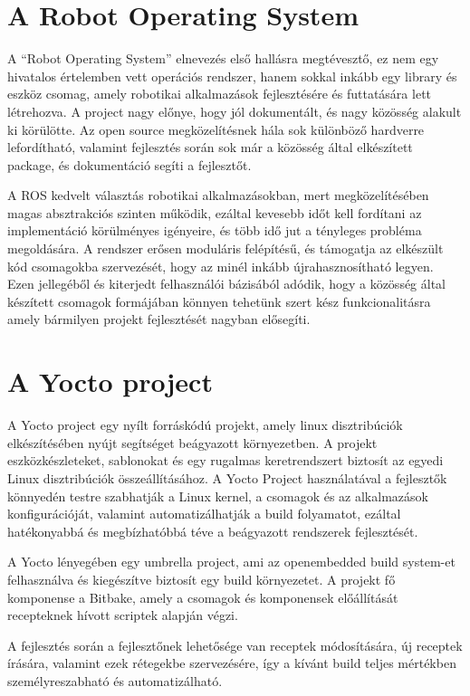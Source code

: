 \section{A Robot Operating System}

A ``Robot Operating System'' elnevezés első hallásra megtévesztő, ez nem egy
hivatalos értelemben vett operációs rendszer, hanem sokkal inkább egy library és
eszköz csomag, amely robotikai alkalmazások fejlesztésére és futtatására lett
létrehozva. A project nagy előnye, hogy jól dokumentált, és nagy közösség alakult
ki körülötte.  Az open source megközelítésnek hála sok különböző hardverre
lefordítható, valamint fejlesztés során sok már a közösség által elkészített
package, és dokumentáció segíti a fejlesztőt.

A ROS kedvelt választás robotikai alkalmazásokban, mert megközelítésében magas
absztrakciós szinten működik, ezáltal kevesebb időt kell fordítani az
implementáció körülményes igényeire, és több idő jut a tényleges probléma
megoldására. A rendszer erősen moduláris felépítésű, és támogatja az elkészült
kód csomagokba szervezését, hogy az minél inkább újrahasznosítható legyen. Ezen
jellegéből és kiterjedt felhasználói bázisából adódik, hogy a közösség által
készített csomagok formájában könnyen tehetünk szert kész funkcionalitásra amely
bármilyen projekt fejlesztését nagyban elősegíti.

\section{A Yocto project}

A Yocto project egy nyílt forráskódú projekt, amely linux disztribúciók
elkészítésében nyújt segítséget beágyazott környezetben. A projekt
eszközkészleteket, sablonokat és egy rugalmas keretrendszert biztosít az egyedi
Linux disztribúciók összeállításához. A Yocto Project használatával a fejlesztők
könnyedén testre szabhatják a Linux kernel, a csomagok és az alkalmazások
konfigurációját, valamint automatizálhatják a build folyamatot, ezáltal
hatékonyabbá és megbízhatóbbá téve a beágyazott rendszerek fejlesztését.

A Yocto lényegében egy umbrella project, ami az openembedded build system-et
felhasználva és kiegészítve biztosít egy build környezetet. A projekt fő
komponense a Bitbake, amely a csomagok és komponensek előállítását recepteknek
hívott scriptek alapján végzi. 

A fejlesztés során a fejlesztőnek lehetősége van receptek módosítására, új
receptek írására, valamint ezek rétegekbe szervezésére, így a kívánt build teljes
mértékben személyreszabható és automatizálható. 

